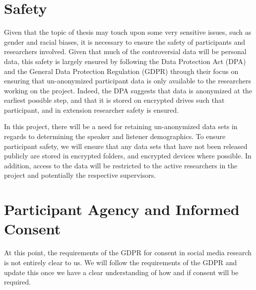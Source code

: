 \section{Safety}\label{sec:ethics:safety}
Given that the topic of thesis may touch upon some very sensitive issues, such as gender and racial biases, it is necessary to ensure the safety of participants and researchers involved. Given that much of the controversial data will be personal data, this safety is largely ensured by following the Data Protection Act (DPA) and the General Data Protection Regulation (GDPR) through their focus on ensuring that un-anonymized participant data is only available to the researchers working on the project. Indeed, the DPA suggests that data is anonymized at the earliest possible step, and that it is stored on encrypted drives such that participant, and in extension researcher safety is ensured.

In this project, there will be a need for retaining un-anonymized data sets in regards to determining the speaker and listener demographics. To ensure participant safety, we will ensure that any data sets that have not been released publicly are stored in encrypted folders, and encrypted devices where possible. In addition, access to the data will be restricted to the active researchers in the project and potentially the respective supervisors.

\section{Participant Agency and Informed Consent}
At this point, the requirements of the GDPR for consent in social media research is not entirely clear to us. We will follow the requirements of the GDPR and update this once we have a clear understanding of how and if consent will be required.
%

